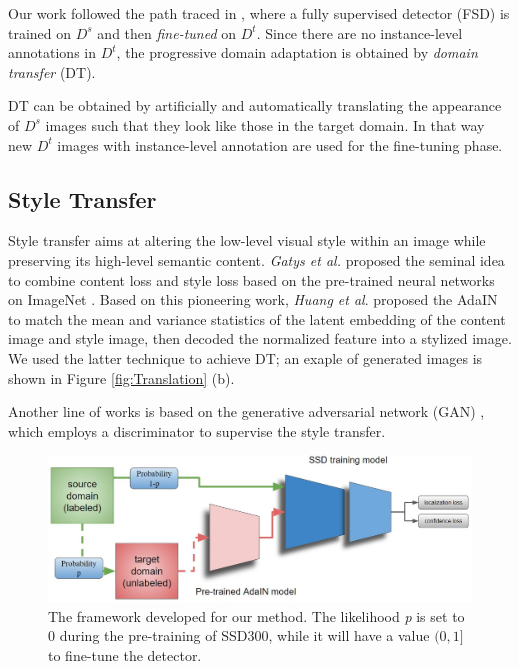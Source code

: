 \documentclass[10pt,twocolumn,letterpaper]{article}
\begin{document}
Our work followed the path traced in \cite{CrossDomObjDet}, where a fully supervised detector (FSD) is trained on \(\mathit{D^s}\) and then {\it fine-tuned} on \(\mathit{D^t}\). Since there are no instance-level annotations in \(\mathit{D^t}\), the progressive domain adaptation is obtained by {\it domain transfer} (DT). 

DT can be obtained by artificially and automatically translating the appearance of  \(\mathit{D^s}\) images such that they look like those in the target domain. In that way new \(\mathit{D^t}\) images with instance-level annotation are used for the fine-tuning phase.






\subsection{Style Transfer}
Style transfer aims at altering the low-level visual style within an image while preserving its high-level semantic content. {\it Gatys et al.} \cite{cordts2016cityscapes} proposed the seminal idea to combine content loss and style loss based on the pre-trained neural networks on ImageNet \cite{chen2018domain}. Based on this pioneering work, {\it Huang et al}. \cite{goodfellow2014generative} proposed the AdaIN to match the mean and variance statistics of the latent embedding of the content image and style image, then decoded the normalized feature into a stylized image. We used the latter technique to achieve DT; an exaple of generated images is shown in Figure \ref{fig:Translation} (b).

Another line of works \cite{li2018semanticaware,zheng2020rectifying,huang2018multimodal} is based on the generative adversarial network (GAN) \cite{goodfellow2014generative}, which employs a discriminator to supervise the style transfer. 

\begin{figure}
\begin{center}
   \includegraphics[width=1\linewidth]{Images/variation_architecture.jpg}
\end{center}
   \caption{The framework developed for our method. The likelihood {\it p} is set to \(0\) during the pre-training of SSD300, while it will have a value \( (0,1]\) to fine-tune the detector.}
\label{fig:Architecture}
\end{figure}
\end{document}
